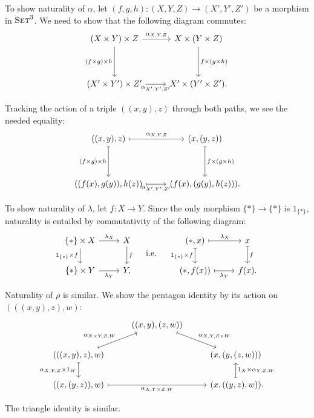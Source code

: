 \begin{ex}
  To show naturality of $\alpha$, let $(f, g, h): (X, Y, Z)\to (X', Y', Z')$ be
  a morphism in ${\textsc{\text{Set}}}^3$. We need to show that the following diagram
  commutes: \[
    \begin{tikzcd}
      (X\times Y)\times Z\ar[r, "\alpha_{X,Y,Z}"]\ar[dd, "(f\times g)\times h"'] &
      X\times(Y\times Z)\ar[dd, "f\times(g\times h)"] \\
      \\
      (X'\times Y')\times Z'\ar[r, "\alpha_{X',Y',Z'}"'] & X'\times(Y'\times Z').
    \end{tikzcd}
  \]

  Tracking the action of a triple $((x, y), z)$ through both paths, we see the
  needed equality: \[
    \begin{tikzcd}
      ((x, y), z)\ar[r, mapsto, "\alpha_{X,Y,Z}"]\ar[dd, mapsto, "(f\times g)\times h"'] & (x, (y, z))\ar[dd, mapsto, "f\times(g\times h)"] \\
      \\
      ((f(x), g(y)), h(z))\ar[r, mapsto, "\alpha_{X',Y',Z'}"'] & (f(x), (g(y), h(z))).
    \end{tikzcd}
  \]

  To show naturality of $\lambda$, let $f: X\to Y$. Since the only morphism
  $\{*\}\to\{*\}$ is $1_{\{*\}}$, naturality is entailed by commutativity of the
  following diagram: \[
    \begin{tikzcd}
      \{*\}\times X\ar[r, "\lambda_X"]\ar[d, "1_{\{*\}}\times f"'] & X\ar[d, "f"] \\
      \{*\}\times Y\ar[r, "\lambda_Y"'] & Y,
    \end{tikzcd}
    \quad\text{ i.e. }\quad
    \begin{tikzcd}
      (*, x)\ar[r, mapsto, "\lambda_X"]\ar[d, mapsto, "1_{\{*\}}\times f"'] & x\ar[d, mapsto, "f"] \\
      (*, f(x))\ar[r, mapsto, "\lambda_Y"'] & f(x).
    \end{tikzcd}
  \]

  Naturality of $\rho$ is similar. We show the pentagon identity by its action
  on $(((x, y), z), w)$: \[
		\begin{tikzcd}
			& ((x, y), (z, w)) & \\
      (((x, y), z), w) & & (x, (y, (z, w))) \\
      ((x, (y, z)), w) & & (x, ((y, z), w))\punctuation{.}
			\arrow[mapsto, "\alpha_{X\times Y, Z, W}", from=2-1, to=1-2]
			\arrow[mapsto, "\alpha_{X, Y, Z\times W}", from=1-2, to=2-3]
			\arrow[mapsto, "\alpha_{X, Y, Z}\times 1_W", from=2-1, to=3-1, swap]
			\arrow[mapsto, "1_X\times\alpha_{Y, Z, W}", from=3-3, to=2-3, swap]
			\arrow[mapsto, "\alpha_{X, Y\times Z, W}", from=3-1, to=3-3, swap]
		\end{tikzcd}
  \]

  The triangle identity is similar.
\end{ex}

